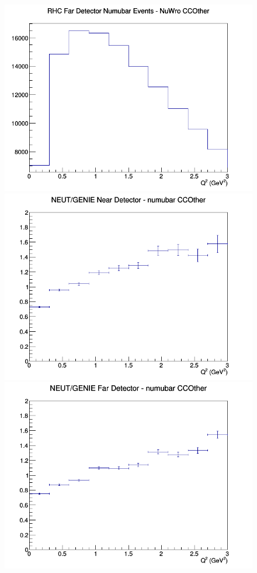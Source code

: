 \begin{figure}[h]
\endminipage
{}
\includegraphics[width=\linewidth]{Q2/nominal/CCOther_RHC_FD_numubar_Q2_NuWro.png}
\endminipage
\newline
{}
\includegraphics[width=\linewidth]{Q2/nominal/ratios/CCOther_NEUT_GENIE_numubar_near_Q2.png}
\endminipage
{}
\includegraphics[width=\linewidth]{Q2/nominal/ratios/CCOther_NEUT_GENIE_numubar_far_Q2.png}

\end{figure}
